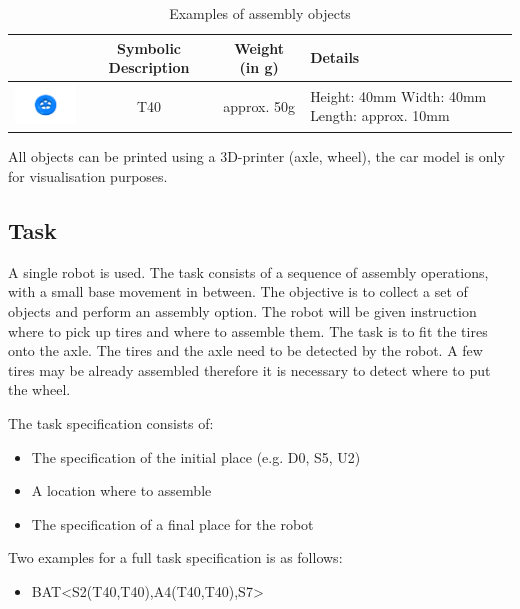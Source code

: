 \begin{table}[p]
\begin{tabular}{|c|c|c|p{5cm}|}
\hline 
 & Symbolic Description & Weight (in g) & Details \\ 
\hline 
\includegraphics[width=3cm]{./images/BAT_Tire.png}  & T40 & approx. 50g & Height: 40mm \newline
 Width: 40mm \newline
 Length: approx. 10mm \\ 
\hline 
\end{tabular} 

\label{tab:bat_objects}
\caption{Examples of assembly objects}
\end{table}

All objects can be printed using a 3D-printer (axle, wheel), the car model is only for visualisation purposes.  

\subsection{Task}
A single robot is used. The task consists of a sequence of assembly operations, with a small base movement in between. The objective is to collect a set of objects and perform an assembly option. The robot will be given instruction where to pick up tires and where to assemble them. The task is to fit the tires onto the axle. The tires and the axle need to be detected by the robot. A few tires may be already assembled therefore it is necessary to detect where to put the wheel.

\par
The task specification consists of: 
\begin{itemize}
	\item The specification of the initial place (e.g. D0, S5, U2)
	\item A location where to assemble
	\item The specification of a final place for the robot 
\end{itemize}

Two examples for a full task specification is as follows:
\begin{itemize}
	\item BAT\textless S2(T40,T40),A4(T40,T40),S7\textgreater  
\end{itemize}

